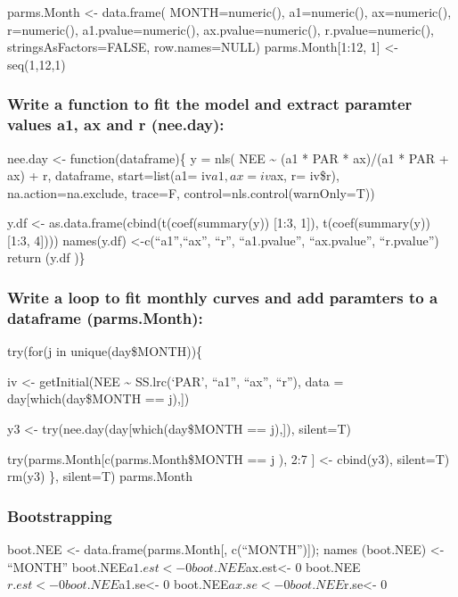 \documentclass[
]{article}
\begin{document}
parms.Month \textless- data.frame( MONTH=numeric(), a1=numeric(),
ax=numeric(), r=numeric(), a1.pvalue=numeric(), ax.pvalue=numeric(),
r.pvalue=numeric(), stringsAsFactors=FALSE, row.names=NULL)
parms.Month{[}1:12, 1{]} \textless- seq(1,12,1)

\hypertarget{write-a-function-to-fit-the-model-and-extract-paramter-values-a1-ax-and-r-nee.day}{%
\subsubsection{Write a function to fit the model and extract paramter
values a1, ax and r
(nee.day):}\label{write-a-function-to-fit-the-model-and-extract-paramter-values-a1-ax-and-r-nee.day}}

nee.day \textless- function(dataframe)\{ y = nls( NEE \textasciitilde{}
(a1 * PAR * ax)/(a1 * PAR + ax) + r, dataframe, start=list(a1=
iv\(a1 , ax= iv\)ax, r= iv\$r), na.action=na.exclude, trace=F,
control=nls.control(warnOnly=T))

y.df \textless- as.data.frame(cbind(t(coef(summary(y)) {[}1:3, 1{]}),
t(coef(summary(y)) {[}1:3, 4{]}))) names(y.df)
\textless-c(``a1'',``ax'', ``r'', ``a1.pvalue'', ``ax.pvalue'',
``r.pvalue'') return (y.df )\}

\hypertarget{write-a-loop-to-fit-monthly-curves-and-add-paramters-to-a-dataframe-parms.month}{%
\subsubsection{Write a loop to fit monthly curves and add paramters to a
dataframe
(parms.Month):}\label{write-a-loop-to-fit-monthly-curves-and-add-paramters-to-a-dataframe-parms.month}}

try(for(j in unique(day\$MONTH))\{

iv \textless- getInitial(NEE \textasciitilde{} SS.lrc(`PAR', ``a1'',
``ax'', ``r''), data = day{[}which(day\$MONTH == j),{]})

y3 \textless- try(nee.day(day{[}which(day\$MONTH == j),{]}), silent=T)

try(parms.Month{[}c(parms.Month\$MONTH == j ), 2:7 {]} \textless-
cbind(y3), silent=T) rm(y3) \}, silent=T) parms.Month

\hypertarget{bootstrapping}{%
\subsubsection{Bootstrapping}\label{bootstrapping}}

boot.NEE \textless- data.frame(parms.Month{[}, c(``MONTH''){]}); names
(boot.NEE) \textless- ``MONTH''
boot.NEE\(a1.est <- 0 boot.NEE\)ax.est\textless- 0
boot.NEE\(r.est<- 0 boot.NEE\)a1.se\textless- 0
boot.NEE\(ax.se<- 0 boot.NEE\)r.se\textless- 0
\end{document}
